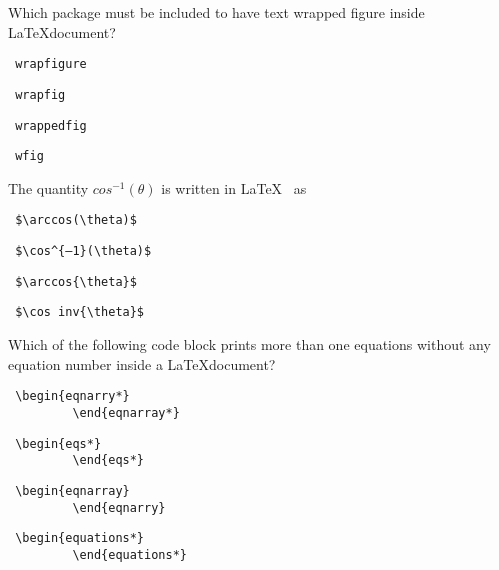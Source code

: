 \documentclass{exam}
\begin{document}
\begin{questions}
\question Which package must be included to have text wrapped figure inside \LaTeX document? %
\begin{multicols}{2}
	\begin{choices}
		\choice \begin{verbatim} wrapfigure \end{verbatim}
		\choice \begin{verbatim} wrapfig \end{verbatim}
		\choice \begin{verbatim} wrappedfig \end{verbatim}
		\choice \begin{verbatim} wfig \end{verbatim}
	\end{choices}
\end{multicols}

\question The quantity $cos^{-1}(\theta)$ is written in \LaTeX ~ as %
\begin{multicols}{2}
	\begin{choices}
		\choice \begin{verbatim} $\arccos(\theta)$ \end{verbatim}
		\choice \begin{verbatim} $\cos^{–1}(\theta)$ \end{verbatim}
		\choice \begin{verbatim} $\arccos{\theta}$ \end{verbatim}
		\choice \begin{verbatim} $\cos inv{\theta}$ \end{verbatim}
	\end{choices}
\end{multicols}

\question Which of the following code block prints more than one equations without any equation number inside a
\LaTeX document? %
\begin{multicols}{2}
	\begin{choices}
		\choice \begin{verbatim} \begin{eqnarry*}
		 \end{eqnarray*} \end{verbatim}
		\choice \begin{verbatim} \begin{eqs*}
		 \end{eqs*} \end{verbatim}
		\choice \begin{verbatim} \begin{eqnarray}
		 \end{eqnarry} \end{verbatim}
		\choice \begin{verbatim} \begin{equations*}
		 \end{equations*} \end{verbatim}
	\end{choices}
\end{multicols}


\end{questions}
\end{document}
